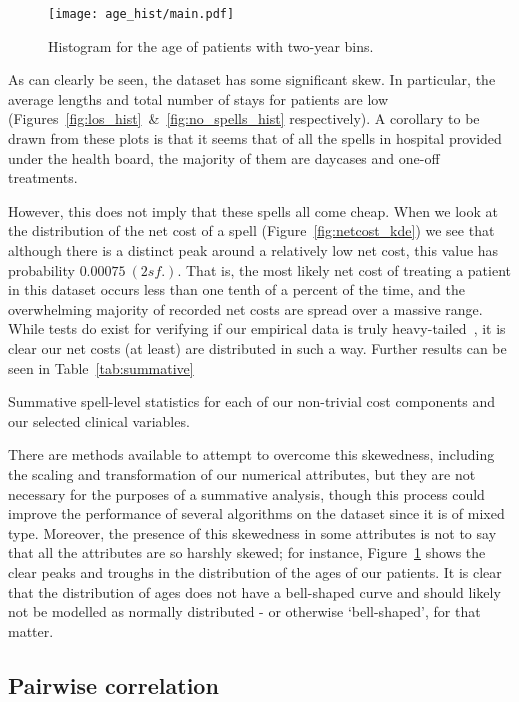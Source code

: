 \begin{figure}[h]
    \centering
    \texttt{[image: age\_hist/main.pdf]}
    \caption{Histogram for the age of patients with two-year
    bins.}\label{fig:age_hist}
\end{figure}

As can clearly be seen, the dataset has some significant skew. In particular,
the average lengths and total number of stays for patients are low
(Figures~\ref{fig:los_hist}~\&~\ref{fig:no_spells_hist} respectively). A
corollary to be drawn from these plots is that it seems that of all the spells
in hospital provided under the health board, the majority of them are daycases
and one-off treatments.

However, this does not imply that these spells all come cheap. When we look at
the distribution of the net cost of a spell (Figure~\ref{fig:netcost_kde}) we
see that although there is a distinct peak around a relatively low net cost,
this value has probability \(0.00075 \ (2 sf.)\). That is, the most likely net
cost of treating a patient in this dataset occurs less than one tenth of a
percent of the time, and the overwhelming majority of recorded net costs are
spread over a massive range. While tests do exist for verifying if our empirical
data is truly heavy-tailed~\cite{heavytail_tests}, it is clear our net costs (at
least) are distributed in such a way. Further results can be seen in
Table~\ref{tab:summative}

\begin{table}[h]
    \resizebox{\textwidth}{!}{%
    \\
    \\
    
    }
    \caption{Summative spell-level statistics for each of our non-trivial cost
    components and our selected clinical variables.}\label{tab:summative}
\end{table}

There are methods available to attempt to overcome this skewedness, including
the scaling and transformation of our numerical attributes, but they are not
necessary for the purposes of a summative analysis, though this process could
improve the performance of several algorithms on the dataset since it is of
mixed type. Moreover, the presence of this skewedness in some attributes is not
to say that all the attributes are so harshly skewed; for instance,
Figure~\ref{fig:age_hist} shows the clear peaks and troughs in the distribution
of the ages of our patients. It is clear that the distribution of ages does not
have a bell-shaped curve and should likely not be modelled as normally
distributed \-- or otherwise `bell-shaped', for that matter.


\subsection{Pairwise correlation}\label{subsec:corr}
